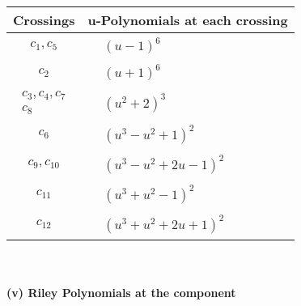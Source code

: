 \documentclass[1p]{elsarticle_modified}
\theoremstyle{definition}
\begin{document}
\begin{tabular}{m{50pt}|m{274pt}}
Crossings & \hspace{64pt}u-Polynomials at each crossing \\
\hline $$\begin{aligned}c_{1},c_{5}\end{aligned}$$&$\begin{aligned}
&(u-1)^6
\end{aligned}$\\
\hline $$\begin{aligned}c_{2}\end{aligned}$$&$\begin{aligned}
&(u+1)^6
\end{aligned}$\\
\hline $$\begin{aligned}c_{3},c_{4},c_{7}\\c_{8}\end{aligned}$$&$\begin{aligned}
&(u^2+2)^3
\end{aligned}$\\
\hline $$\begin{aligned}c_{6}\end{aligned}$$&$\begin{aligned}
&(u^3- u^2+1)^2
\end{aligned}$\\
\hline $$\begin{aligned}c_{9},c_{10}\end{aligned}$$&$\begin{aligned}
&(u^3- u^2+2 u-1)^2
\end{aligned}$\\
\hline $$\begin{aligned}c_{11}\end{aligned}$$&$\begin{aligned}
&(u^3+u^2-1)^2
\end{aligned}$\\
\hline $$\begin{aligned}c_{12}\end{aligned}$$&$\begin{aligned}
&(u^3+u^2+2 u+1)^2
\end{aligned}$\\
\hline
\end{tabular}\\~\\
\newpage\renewcommand{\arraystretch}{1}
\flushleft \textbf{(v) Riley Polynomials at the component}\newline \\
\end{document}
